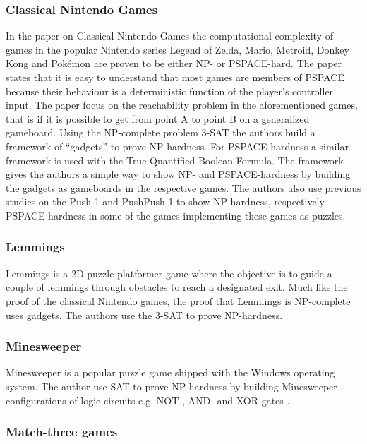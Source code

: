 \subsubsection{Classical Nintendo Games}

In the paper on Classical Nintendo Games the computational complexity of games in the popular Nintendo series Legend of Zelda, Mario, Metroid, Donkey Kong and Pokémon are proven to be either NP- or PSPACE-hard. The paper states that it is easy to understand that most games are members of PSPACE because their behaviour is a deterministic function of the player's controller input. The paper focus on the reachability problem in the aforementioned games, that is if it is possible to get from point A to point B on a generalized gameboard. Using the NP-complete problem 3-SAT the authors build a framework of ``gadgets'' to prove NP-hardness. For PSPACE-hardness a similar framework is used with the True Quantified Boolean Formula. The framework gives the authors a simple way to show NP- and PSPACE-hardness by building the gadgets as gameboards in the respective games. The authors also use previous studies on the Push-1 \cite{push1} and PushPush-1 \cite{pushpushk} to show NP-hardness, respectively PSPACE-hardness in some of the games implementing these games as puzzles. 

\subsubsection{Lemmings}

Lemmings is a 2D puzzle-platformer game where the objective is to guide a couple of lemmings through obstacles to reach a designated exit. Much like the proof of the classical Nintendo games, the proof that Lemmings is NP-complete uses gadgets. The authors use the 3-SAT to prove NP-hardness. 

\subsubsection{Minesweeper}
Minesweeper is a popular puzzle game shipped with the Windows operating system. The author use SAT to prove NP-hardness by building Minesweeper configurations of logic circuits e.g. NOT-, AND- and XOR-gates \cite{minesweeper}.

\subsubsection{Match-three games}

